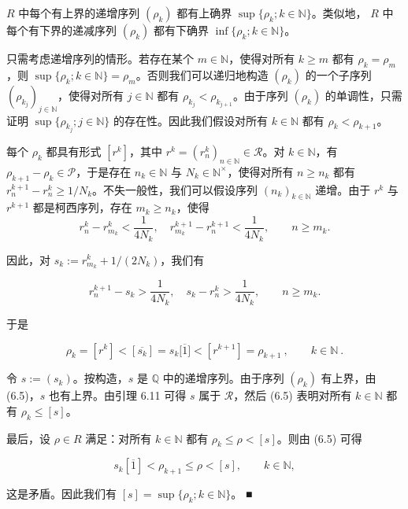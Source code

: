 \begin{lemma}

$ R $ 中每个有上界的递增序列  $ (\rho_k) $ 都有上确界  $ \sup\{\rho_k; k \in \mathbb{N}\} $。类似地， $ R $ 中每个有下界的递减序列  $ (\rho_k) $ 都有下确界  $ \inf\{\rho_k; k \in \mathbb{N}\} $。

\proofhead
只需考虑递增序列的情形。若存在某个  $ m \in \mathbb{N} $，使得对所有  $ k \geq m $ 都有  $ \rho_k = \rho_m $，则  $ \sup\{\rho_k; k \in \mathbb{N}\} = \rho_m $。否则我们可以递归地构造  $ (\rho_k) $ 的一个子序列  $ (\rho_{k_j})_{j \in \mathbb{N}} $，使得对所有  $ j \in \mathbb{N} $ 都有  $ \rho_{k_j} < \rho_{k_{j+1}} $。由于序列  $ (\rho_k) $ 的单调性，只需证明  $ \sup\{\rho_{k_j}; j \in \mathbb{N}\} $ 的存在性。因此我们假设对所有  $ k \in \mathbb{N} $ 都有  $ \rho_k < \rho_{k+1} $。

每个 $\rho_k$ 都具有形式 $[r^k]$，其中 $r^k = (r_n^k)_{n \in \mathbb{N}} \in \mathcal{R}$。对 $k \in \mathbb{N}$，有 $\rho_{k+1} - \rho_k \in \mathcal{P}$，于是存在 $n_k \in \mathbb{N}$ 与 $N_k \in \mathbb{N}^\times$，使得对所有 $n \geq n_k$ 都有 $r_n^{k+1} - r_n^k \geq 1/N_k$。不失一般性，我们可以假设序列 $(n_k)_{k \in \mathbb{N}}$ 递增。由于 $r^k$ 与 $r^{k+1}$ 都是柯西序列，存在 $m_k \geq n_k$，使得
\[
r_{n}^{k}-r_{m_{k}}^{k}<\frac{1}{4N_{k}},\quad r_{m_{k}}^{k+1}-r_{n}^{k+1}<\frac{1}{4N_{k}},\qquad n\geq m_{k}.
\]

因此，对  $ s_k := r_{m_k}^k + 1/(2N_k) $，我们有

\[
r_{n}^{k+1}-s_{k}>\frac{1}{4N_{k}},\quad s_{k}-r_{n}^{k}>\frac{1}{4N_{k}},\qquad n\geq m_{k}.
\]

于是

\begin{equation}
\rho_{k}=[r^{k}]<[\overline{{s_{k}}}]=s_{k}\big[\overline{{1}}\big]<[r^{k+1}]=\rho_{k+1}~,\qquad k\in\mathbb{N}~.
\end{equation}

令 $s := (s_k)$。按构造，$s$ 是 $\mathbb{Q}$ 中的递增序列。由于序列 $(\rho_k)$ 有上界，由 (6.5)，$s$ 也有上界。由引理 6.11 可得 $s$ 属于 $\mathcal{R}$，然后 (6.5) 表明对所有 $k \in \mathbb{N}$ 都有 $\rho_k \leq [s]$。

最后，设  $ \rho \in R $ 满足：对所有  $ k \in \mathbb{N} $ 都有  $ \rho_k \leq \rho < [s] $。则由 (6.5) 可得

\[
s_{k}\left[\overline{1}\right]<\rho_{k+1}\leq\rho<\left[s\right],\qquad k\in\mathbb{N},
\]

这是矛盾。因此我们有  $ [s] = \sup\{\rho_k; k \in \mathbb{N}\} $。 ■

\end{lemma}

